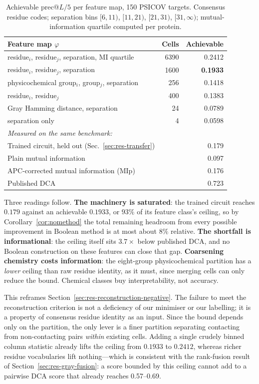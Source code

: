 \begin{table}[htbp]
\centering
\caption{Achievable prec@$L/5$ per feature map, 150 PSICOV targets.
Consensus residue codes; separation bins $[6,11)$, $[11,21)$, $[21,31)$,
$[31,\infty)$; mutual-information quartile computed per protein.}
\label{tab:ceiling}
\begin{tabular}{lrr}
\toprule
Feature map $\varphi$ & Cells & Achievable \\
\midrule
residue$_i$, residue$_j$, separation, MI quartile & 6390 & 0.2412 \\
residue$_i$, residue$_j$, separation              & 1600 & \textbf{0.1933} \\
physicochemical group$_i$, group$_j$, separation  & 256  & 0.1418 \\
residue$_i$, residue$_j$                          & 400  & 0.1383 \\
Gray Hamming distance, separation                 & 24   & 0.0789 \\
separation only                                   & 4    & 0.0598 \\
\midrule
\multicolumn{3}{l}{\emph{Measured on the same benchmark:}} \\
Trained circuit, held out (Sec.~\ref{sec:res-transfer}) & & 0.179 \\
Plain mutual information                                & & 0.097 \\
APC-corrected mutual information (MIp)                  & & 0.176 \\
Published DCA~\cite{jones2012}                          & & 0.723 \\
\bottomrule
\end{tabular}
\end{table}

Three readings follow.  \textbf{The machinery is saturated}: the trained
circuit reaches $0.179$ against an achievable $0.1933$, or $93\%$ of its
feature class's ceiling, so by Corollary~\ref{cor:nomethod} the total remaining
headroom from every possible improvement in Boolean method is at most about
$8\%$ relative.  \textbf{The shortfall is informational}: the ceiling itself
sits $3.7\times$ below published DCA, and no Boolean construction on these
features can close that gap.  \textbf{Coarsening chemistry costs information}:
the eight-group physicochemical partition has a \emph{lower} ceiling than raw
residue identity, as it must, since merging cells can only reduce the bound.
Chemical classes buy interpretability, not accuracy.

This reframes Section~\ref{sec:res-reconstruction-negative}.  The failure to
meet the reconstruction criterion is not a deficiency of our minimiser or our
labelling; it is a property of consensus residue identity as an input.  Since
the bound depends only on the partition, the only lever is a finer partition
separating contacting from non-contacting pairs \emph{within} existing cells.
Adding a single crudely binned column statistic already lifts the ceiling from
$0.1933$ to $0.2412$, whereas richer residue vocabularies lift nothing---which
is consistent with the rank-fusion result of
Section~\ref{sec:res-gray-fusion}: a score bounded by this ceiling cannot add
to a pairwise DCA score that already reaches 0.57--0.69.
